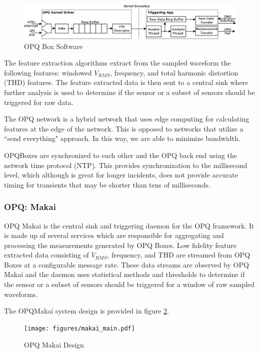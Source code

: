 \begin{figure}
	\centering
	\includegraphics[width=.75\linewidth]{figures/opqbox_software.png}
	\caption{OPQ Box Software}\label{fig:opq-box-software}
\end{figure}

The feature extraction algorithms extract from the sampled waveform the following features: windowed $V_{RMS}$, frequency, and total harmonic distortion (THD) features. The feature extracted data is then sent to a central sink where further analysis is used to determine if the sensor or a subset of sensors should be triggered for raw data.

The OPQ network is a hybrid network that uses edge computing for calculating features at the edge of the network. This is opposed to networks that utilize a ``send everything" approach. In this way, we are able to minimize bandwidth. 

OPQBoxes are synchronized to each other and the OPQ back end using the network time protocol (NTP). This provides synchronization to the millisecond level, which although is great for longer incidents, does not provide accurate timing for transients that may be shorter than tens of milliseconds.


\subsubsection{OPQ: Makai}
OPQ Makai is the central sink and triggering daemon for the OPQ framework. It is made up of several services which are responsible for aggregating and processing the measurements generated by OPQ Boxes. Low fidelity feature extracted data consisting of $V_{RMS}$, frequency, and THD are streamed from OPQ Boxes at a configurable message rate. These data streams are observed by OPQ Makai and the daemon uses statistical methods and thresholds to determine if the sensor or a subset of sensors should be triggered for a window of raw sampled waveforms. 

The OPQMakai system design is provided in figure \ref{fig:makai-main}.

\begin{figure}
	\centering
	\texttt{[image: figures/makai\_main.pdf]}
	\caption{OPQ Makai Design}\label{fig:makai-main}
\end{figure}

